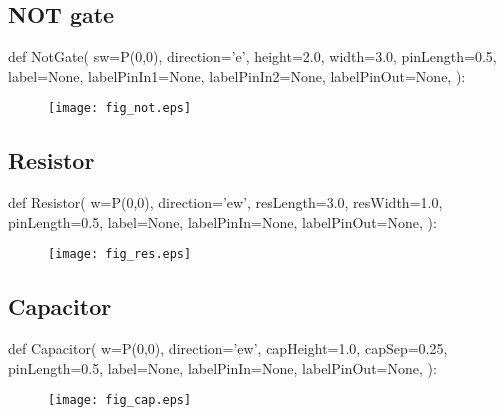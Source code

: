 \subsection{NOT gate}
\label{func:electronicsNot}
\begin{python}
def NotGate(
        sw=P(0,0),
        direction='e',
        height=2.0,
        width=3.0,
        pinLength=0.5,
        label=None,
        labelPinIn1=None,
        labelPinIn2=None,
        labelPinOut=None,
        ):
\end{python}

\begin{figure}[!h]
\centerline{\texttt{[image: fig\_not.eps]}}
\end{figure}

\subsection{Resistor}
\label{func:electronicsResistor}
\begin{python}
def Resistor(
        w=P(0,0),
        direction='ew',
        resLength=3.0,
        resWidth=1.0,
        pinLength=0.5,
        label=None,
        labelPinIn=None,
        labelPinOut=None,
        ):
\end{python}

\begin{figure}[!h]
\centerline{\texttt{[image: fig\_res.eps]}}
\end{figure}

\subsection{Capacitor}
\label{func:electronicsCapacitor}
\begin{python}
def Capacitor(
        w=P(0,0),
        direction='ew',
        capHeight=1.0,
        capSep=0.25,
        pinLength=0.5,
        label=None,
        labelPinIn=None,
        labelPinOut=None,
        ):
\end{python}

\begin{figure}[!h]
\centerline{\texttt{[image: fig\_cap.eps]}}
\end{figure}

